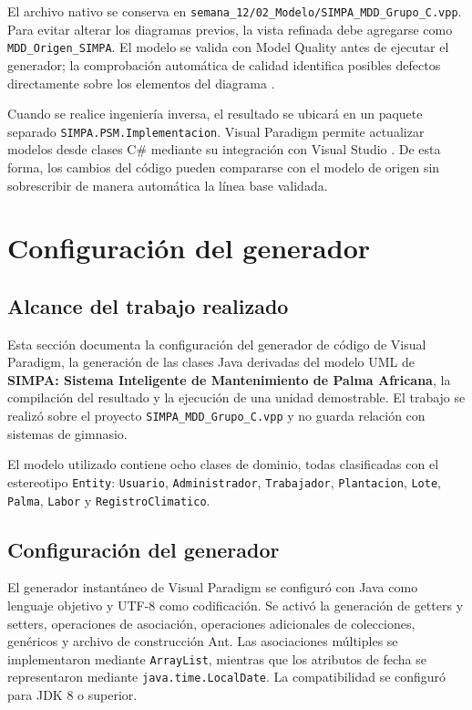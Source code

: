 \documentclass[11pt,a4paper]{article}
\begin{document}
El archivo nativo se conserva en
\texttt{semana\_12/02\_Modelo/SIMPA\_MDD\_Grupo\_C.vpp}. Para evitar alterar
los diagramas previos, la vista refinada debe agregarse como
\texttt{MDD\_Origen\_SIMPA}. El modelo se valida con Model Quality antes de ejecutar el
generador; la comprobación automática de calidad identifica posibles defectos directamente
sobre los elementos del diagrama \cite{vpModelQuality}.

Cuando se realice ingeniería inversa, el resultado se ubicará en un paquete separado
\texttt{SIMPA.PSM.Implementacion}.
Visual Paradigm permite actualizar modelos desde
clases C\# mediante su integración con Visual Studio \cite{vpVisualStudioReverse}. De esta
forma, los cambios del código pueden compararse con el modelo de origen sin sobrescribir
de manera automática la línea base validada.




\section{Configuración del generador}

\subsection{Alcance del trabajo realizado}

Esta sección documenta la configuración del generador de código de Visual Paradigm, la generación de las clases Java derivadas del modelo UML de \textbf{SIMPA: Sistema Inteligente de Mantenimiento de Palma Africana}, la compilación del resultado y la ejecución de una unidad demostrable. El trabajo se realizó sobre el proyecto \texttt{SIMPA\_MDD\_Grupo\_C.vpp} y no guarda relación con sistemas de gimnasio.

El modelo utilizado contiene ocho clases de dominio, todas clasificadas con el estereotipo \texttt{Entity}: \texttt{Usuario}, \texttt{Administrador}, \texttt{Trabajador}, \texttt{Plantacion}, \texttt{Lote}, \texttt{Palma}, \texttt{Labor} y \texttt{RegistroClimatico}.

\subsection{Configuración del generador}

El generador instantáneo de Visual Paradigm se configuró con Java como lenguaje objetivo y UTF-8 como codificación. Se activó la generación de getters y setters, operaciones de asociación, operaciones adicionales de colecciones, genéricos y archivo de construcción Ant. Las asociaciones múltiples se implementaron mediante \texttt{ArrayList}, mientras que los atributos de fecha se representaron mediante \texttt{java.time.LocalDate}. La compatibilidad se configuró para JDK 8 o superior.
\end{document}
